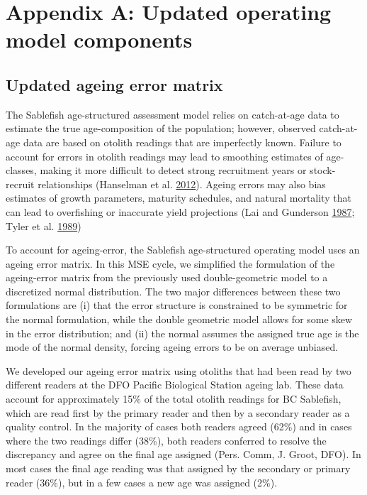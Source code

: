 \documentclass[11pt]{book}
\begin{document}
\MakeFirstPage

\hypertarget{appendix-appendices}{%
\appendix}


\hypertarget{appendix-a-updated-operating-model-components}{%
\section{Appendix A: Updated operating model components}\label{appendix-a-updated-operating-model-components}}

\setcounter{table}{0}\setcounter{figure}{0}

\hypertarget{updated-ageing-error-matrix}{%
\subsection{Updated ageing error matrix}\label{updated-ageing-error-matrix}}

The Sablefish age-structured assessment model relies on catch-at-age data to estimate the true age-composition of the population; however, observed catch-at-age data are based on otolith readings that are imperfectly known. Failure to account for errors in otolith readings may lead to smoothing estimates of age-classes, making it more difficult to detect strong recruitment years or stock-recruit relationships (Hanselman et al. \protect\hyperlink{ref-hanselman2012statistical}{2012}). Ageing errors may also bias estimates of growth parameters, maturity schedules, and natural mortality that can lead to overfishing or inaccurate yield projections (Lai and Gunderson \protect\hyperlink{ref-lai1987effects}{1987}; Tyler et al. \protect\hyperlink{ref-tyler1989implications}{1989})

To account for ageing-error, the Sablefish age-structured operating model uses an ageing error matrix. In this MSE cycle, we simplified the formulation of the ageing-error matrix from the previously used double-geometric model to a discretized normal distribution. The two major differences between these two formulations are (i) that the error structure is constrained to be symmetric for the normal formulation, while the double geometric model allows for some skew in the error distribution; and (ii) the normal assumes the assigned true age is the mode of the normal density, forcing ageing errors to be on average unbiased.

We developed our ageing error matrix using otoliths that had been read by two different readers at the DFO Pacific Biological Station ageing lab. These data account for approximately 15\% of the total otolith readings for BC Sablefish, which are read first by the primary reader and then by a secondary reader as a quality control. In the majority of cases both readers agreed (62\%) and in cases where the two readings differ (38\%), both readers conferred to resolve the discrepancy and agree on the final age assigned (Pers. Comm, J. Groot, DFO). In most cases the final age reading was that assigned by the secondary or primary reader (36\%), but in a few cases a new age was assigned (2\%).
\end{document}
